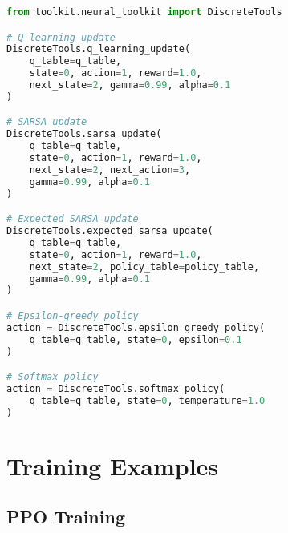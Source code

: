 \begin{lstlisting}[language=python, caption=Discrete Tools Usage]
from toolkit.neural_toolkit import DiscreteTools

# Q-learning update
DiscreteTools.q_learning_update(
    q_table=q_table,
    state=0, action=1, reward=1.0,
    next_state=2, gamma=0.99, alpha=0.1
)

# SARSA update
DiscreteTools.sarsa_update(
    q_table=q_table,
    state=0, action=1, reward=1.0,
    next_state=2, next_action=3,
    gamma=0.99, alpha=0.1
)

# Expected SARSA update
DiscreteTools.expected_sarsa_update(
    q_table=q_table,
    state=0, action=1, reward=1.0,
    next_state=2, policy_table=policy_table,
    gamma=0.99, alpha=0.1
)

# Epsilon-greedy policy
action = DiscreteTools.epsilon_greedy_policy(
    q_table=q_table, state=0, epsilon=0.1
)

# Softmax policy
action = DiscreteTools.softmax_policy(
    q_table=q_table, state=0, temperature=1.0
)
\end{lstlisting}

\section{Training Examples}

\subsection{PPO Training}

